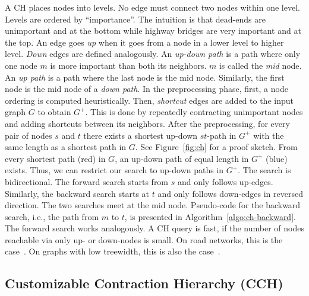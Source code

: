 \documentclass[manuscript,review]{acmart}
\begin{document}
A CH places nodes into levels.
No edge must connect two nodes within one level.
Levels are ordered by ``importance''.
The intuition is that dead-ends are unimportant and at the bottom while highway bridges are very important and at the top.
An edge goes \emph{up} when it goes from a node in a lower level to higher level.
\emph{Down} edges are defined analogously.
An \emph{up-down path} is a path where only one node $m$ is more important than both its neighbors.
$m$ is called the \emph{mid} node.
An \emph{up path} is a path where the last node is the mid node.
Similarly, the first node is the mid node of a \emph{down path}.
%
In the preprocessing phase, first, a node ordering is computed heuristically.
Then, \emph{shortcut} edges are added to the input graph $G$ to obtain $G^+$.
This is done by repeatedly contracting unimportant nodes and adding shortcuts between its neighbors.
After the preprocessing, for every pair of nodes $s$ and $t$ there exists a shortest up-down $st$-path in $G^+$ with the same length as a shortest path in $G$.
See Figure~\ref{fig:ch} for a proof sketch.
From every shortest path (red) in $G$, an up-down path of equal length in $G^+$ (blue) exists.
Thus, we can restrict our search to up-down paths in $G^+$.
The search is bidirectional.
The forward search starts from $s$ and only follows up-edges.
Similarly, the backward search starts at $t$ and only follows down-edges in reversed direction.
The two searches meet at the mid node.
Pseudo-code for the backward search, i.e., the path from $m$ to $t$, is presented in Algorithm~\ref{algo:ch-backward}.
The forward search works analogously.
%
A CH query is fast, if the number of nodes reachable via only up- or down-nodes is small.
On road networks, this is the case~\cite{gssv-erlrn-12,dgpw-crprn-13}.
On graphs with low treewidth, this is also the case~\cite{dsw-cch-15,hs-gbpo-18}.


\subsection{Customizable Contraction Hierarchy (CCH)}
\end{document}
